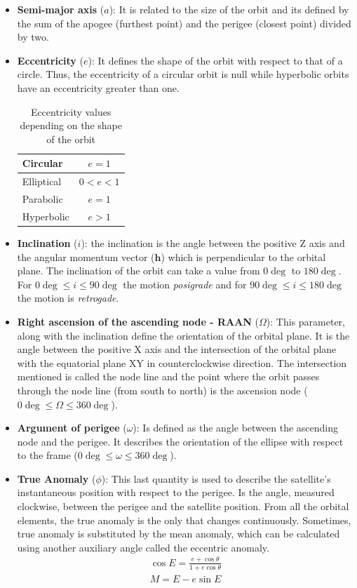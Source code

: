 \begin{itemize}
\item\textbf{Semi-major axis} ($a$): It is related to the size of the orbit and its defined by the sum of the apogee (furthest point) and the perigee (closest point) divided by two.
\item\textbf{Eccentricity} ($e$): It defines the shape of the orbit with respect to that of a circle. Thus, the eccentricity of a circular orbit is null while hyperbolic orbits have an eccentricity greater than one.
\begin{table}[H]
\centering
\label{tb:evalues}
\begin{tabular}{|l|c|}
\hline
Circular     & $e=1$   \\ \hline
Elliptical   & $0<e<1$ \\ \hline
Parabolic  	 & $e=1$   \\ \hline
Hyperbolic   & $e>1$   \\ \hline
\end{tabular}
\caption{Eccentricity values depending on the shape of the orbit}
\end{table}
\item\textbf{Inclination} ($i$): the inclination is the angle between the positive Z axis and the angular momentum vector ($\textbf{h}$) which is perpendicular to the orbital plane. The inclination of the orbit can take a value from $0\deg$ to $180\deg$. For $0\deg\leq i\leq 90\deg$ the motion \textit{posigrade} and for $90\deg\leq i\leq 180\deg$ the motion is \textit{retrogade}.
\item\textbf{Right ascension of the ascending node - RAAN} ($\Omega$): This parameter, along with the inclination define the orientation of the orbital plane. It is the angle between the positive X axis and the intersection of the orbital plane with the equatorial plane XY in counterclockwise direction. The intersection mentioned is called the node line and the point where the orbit passes through the node line (from south to north) is the ascension node ($0\deg\leq \Omega\leq 360\deg$).
\item\textbf{Argument of perigee} ($\omega$): Is defined as the angle between the ascending node and the perigee. It describes the orientation of the ellipse with respect to the frame ($0\deg\leq \omega\leq 360\deg$). 
\item\textbf{True Anomaly} ($\phi$): This last quantity is used to describe the satellite's instantaneous position with respect to the perigee. Is the angle, measured clockwise, between the perigee and the satellite position. From all the orbital elements, the true anomaly is the only that changes continuously. Sometimes, true anomaly is substituted by the mean anomaly, which can be calculated using another auxiliary angle called the eccentric anomaly.
\begin{equation}
\begin{gathered}
\cos E=\frac{e+\cos \theta}{1+e\cos \theta}\\
M=E-e\sin E
\end{gathered}
\end{equation}

\end{itemize}

